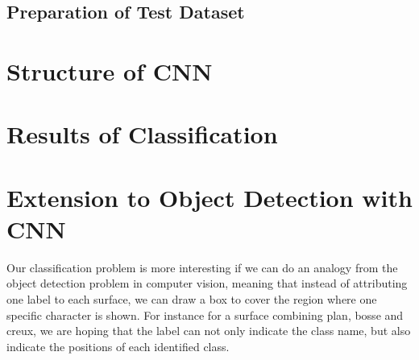 \documentclass[a4paper,10pt]{article}
\begin{document}
\subsection{Preparation of Test Dataset}


\section{Structure of CNN}

\section{Results of Classification}

\section{Extension to Object Detection with CNN}

Our classification problem is more interesting if we can do an analogy from the object detection problem in computer vision, meaning that instead of attributing one label to each surface, we can draw a box to cover the region where one specific character is shown. For instance for a surface combining plan, bosse and creux, we are hoping that the label can not only indicate the class name, but also indicate the positions of each identified class.
\end{document}
